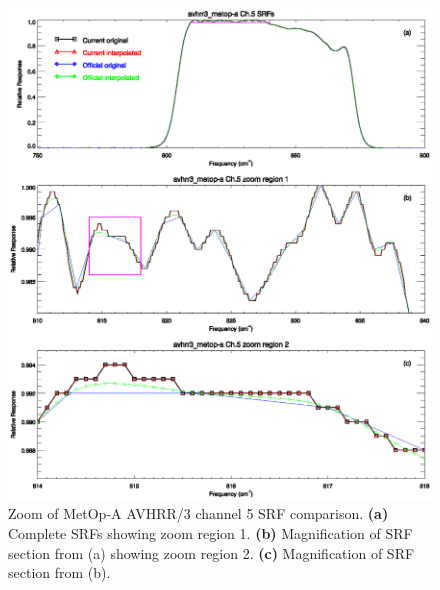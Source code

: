 \begin{figure}[htp]
  \centering
  \includegraphics[scale=1]{graphics/zoom/avhrr3_metop-a.ch5.srf.zoom.eps}
  \caption{Zoom of MetOp-A AVHRR/3 channel 5 SRF comparison. \textbf{(a)} Complete SRFs showing zoom region 1. \textbf{(b)} Magnification of SRF section from (a) showing zoom region 2.  \textbf{(c)} Magnification of SRF section from (b).}
  \label{fig:avhrr3_metop-a.ch5.srf.zoom}
\end{figure}


